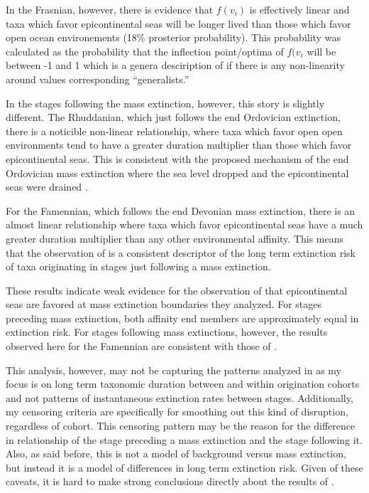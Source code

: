 \documentclass[12pt,letterpaper]{article}
\begin{document}
In the Frasnian, however, there is evidence that \(f(v_{i})\) is effectively linear and taxa which favor epicontinental seas will be longer lived than those which favor open ocean environements (18\% prosterior probability). This probability was calculated as the probability that the inflection point/optima of \(f(v_{i}\) will be between -1 and 1 which is a genera desciription of if there is any non-linearity around values corresponding ``generalists.''

In the stages following the mass extinction, however, this story is slightly different. The Rhuddanian, which just follows the end Ordovician extinction, there is a noticible non-linear relationship, where taxa which favor open open environments tend to have a greater duration multiplier than those which favor epicontinental seas. This is consistent with the proposed mechanism of the end Ordovician mass extinction where the sea level dropped and the epicontinental seas were drained \citep{Johnson1974,Sheehan2001b}. 

For the Famennian, which follows the end Devonian mass extinction, there is an almost linear relationship where taxa which favor epicontinental seas have a much greater duration multiplier than any other environmental affinity. This means that the observation of \citet{Miller2009a} is a consistent descriptor of the long term extinction risk of taxa originating in stages just following a mass extinction.

These results indicate weak evidence for the observation of \citet{Miller2009a} that epicontinental seas are favored at mass extinction boundaries they analyzed. For stages preceding mass extinction, both affinity end members are approximately equal in extinction risk. For stages following mass extinctions, however, the results observed here for the Famennian are consistent with those of \citet{Miller2009a}.

This analysis, however, may not be capturing the patterns analyzed in \citet{Miller2009a} as my focus is on long term taxonomic duration between and within origination cohorts and not patterns of instantaneous extinction rates between stages. Additionally, my censoring criteria are specifically for smoothing out this kind of disruption, regardless of cohort. This censoring pattern may be the reason for the difference in relationship of the stage preceding a mass extinction and the stage following it. Also, as said before, this is not a model of background versus mass extinction, but instead it is a model of differences in long term extinction risk. Given of these caveats, it is hard to make strong conclusions directly about the results of \citet{Miller2009a}.
\end{document}

